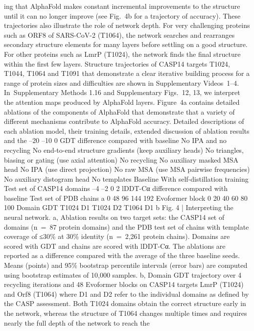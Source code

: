 ing that AlphaFold makes constant incremental improvements to the
structure until it can no longer improve (see Fig. 4b for a trajectory of
accuracy). These trajectories also illustrate the role of network depth.
For very challenging proteins such as ORF8 of SARS-CoV-2 (T1064),
the network searches and rearranges secondary structure elements
for many layers before settling on a good structure. For other proteins
such as LmrP (T1024), the network finds the final structure within the
first few layers. Structure trajectories of CASP14 targets T1024, T1044,
T1064 and T1091 that demonstrate a clear iterative building process
for a range of protein sizes and difficulties are shown in Supplementary
Videos 1–4. In Supplementary Methods 1.16 and Supplementary Figs. 12,
13, we interpret the attention maps produced by AlphaFold layers.
Figure 4a contains detailed ablations of the components of AlphaFold
that demonstrate that a variety of different mechanisms contribute
to AlphaFold accuracy. Detailed descriptions of each ablation model,
their training details, extended discussion of ablation results and the
–20
–10
0
GDT difference compared
with baseline
No IPA and no recycling
No end-to-end structure gradients
(keep auxiliary heads)
No triangles, biasing or gating
(use axial attention)
No recycling
No auxiliary masked MSA head
No IPA (use direct projection)
No raw MSA
(use MSA pairwise frequencies)
No auxiliary distogram head
No templates
Baseline
With self-distillation training
Test set of CASP14 domains
–4
–2
0
2
lDDT-Cα difference
compared with baseline
Test set of PDB chains
a
0
48
96
144
192
Evoformer block
0
20
40
60
80
100
Domain GDT
T1024 D1
T1024 D2
T1064 D1
b
Fig. 4 | Interpreting the neural network. a, Ablation results on two target sets:
the CASP14 set of domains (n = 87 protein domains) and the PDB test set of
chains with template coverage of ≤30\% at 30\% identity (n = 2,261 protein
chains). Domains are scored with GDT and chains are scored with lDDT-Cα. The
ablations are reported as a difference compared with the average of the three
baseline seeds. Means (points) and 95\% bootstrap percentile intervals (error
bars) are computed using bootstrap estimates of 10,000 samples. b, Domain
GDT trajectory over 4 recycling iterations and 48 Evoformer blocks on CASP14
targets LmrP (T1024) and Orf8 (T1064) where D1 and D2 refer to the individual
domains as defined by the CASP assessment. Both T1024 domains obtain the
correct structure early in the network, whereas the structure of T1064 changes
multiple times and requires nearly the full depth of the network to reach the
